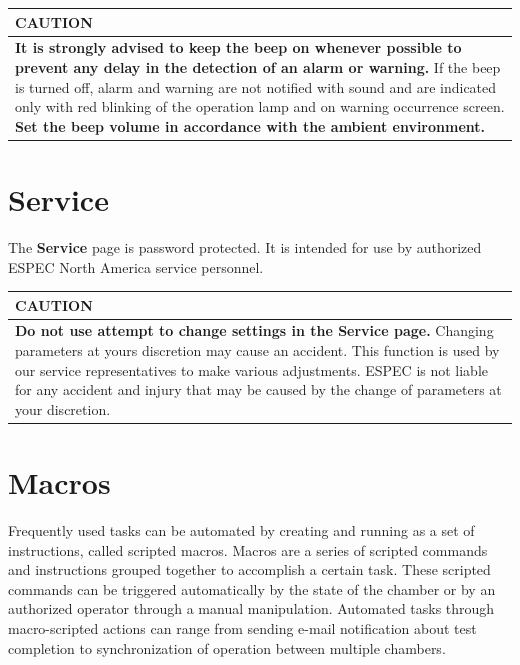 \begin{longtable}[]{@{}l@{}}
\toprule
\begin{minipage}[b]{0.97\columnwidth}\raggedright
CAUTION\strut
\end{minipage}\tabularnewline
\midrule
\endhead
\begin{minipage}[t]{0.97\columnwidth}\raggedright
\textbf{It is strongly advised to keep the beep on whenever possible to
prevent any delay in the detection of an alarm or warning.} If the beep
is turned off, alarm and warning are not notified with sound and are
indicated only with red blinking of the operation lamp and on warning
occurrence screen. \textbf{Set the beep volume in accordance with the
ambient environment.}\strut
\end{minipage}\tabularnewline
\bottomrule
\end{longtable}


\section{Service}

The \textbf{Service} page is password protected. It is intended for use
by authorized ESPEC North America service personnel.

\begin{longtable}[]{@{}l@{}}
\toprule
\begin{minipage}[b]{0.97\columnwidth}\raggedright
CAUTION\strut
\end{minipage}\tabularnewline
\midrule
\endhead
\begin{minipage}[t]{0.97\columnwidth}\raggedright
\textbf{Do not use attempt to change settings in the Service page.}
Changing parameters at yours discretion may cause an accident. This
function is used by our service representatives to make various
adjustments. ESPEC is not liable for any accident and injury that may be
caused by the change of parameters at your discretion.\strut
\end{minipage}\tabularnewline
\bottomrule
\end{longtable}


\section{Macros}

Frequently used tasks can be automated by creating and running as a set
of instructions, called scripted macros. Macros are a series of scripted
commands and instructions grouped together to accomplish a certain task.
These scripted commands can be triggered automatically by the state of
the chamber or by an authorized operator through a manual manipulation.
Automated tasks through macro-scripted actions can range from sending
e-mail notification about test completion to synchronization of
operation between multiple chambers.

